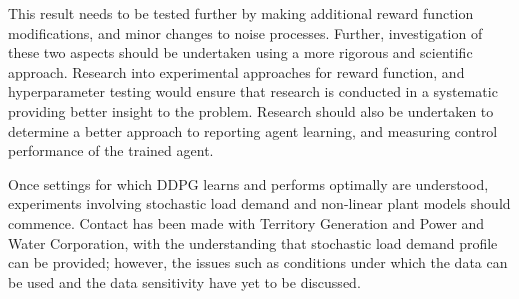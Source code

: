 This result needs to be tested further by making additional reward function modifications, and minor changes to noise processes. Further, investigation of these two aspects should be undertaken using a more rigorous and scientific approach. Research into experimental approaches for reward function, and hyperparameter testing would ensure that research is conducted in a systematic providing better insight to the problem. Research should also be undertaken to determine a better approach to reporting agent learning, and measuring control performance of the trained agent.

Once settings for which DDPG learns and performs optimally are understood, experiments involving stochastic load demand and non-linear plant models should commence. Contact has been made with Territory Generation and Power and Water Corporation, with the understanding that stochastic load demand profile can be provided; however, the issues such as conditions under which the data can be used and the data sensitivity have yet to be discussed.